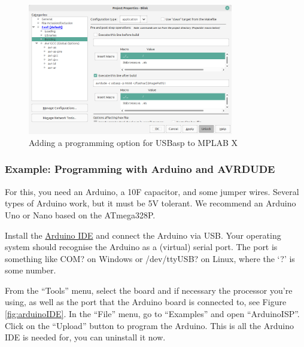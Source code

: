 \documentclass{article}
\begin{document}
\begin{figure}[htb]
\centering
\includegraphics[width=0.8\textwidth]{Pictures/AvrdudeMPLABX.png}
\caption{Adding a programming option for USBasp to MPLAB X}
\label{fig:AvrdudeMPLABX}
\end{figure}

\FloatBarrier
\subsubsection{Example: Programming with Arduino and AVRDUDE}\label{sec:exArduino}
For this, you need an Arduino, a 10\textmu F capacitor, and some jumper wires. Several types of Arduino work, but it must be 5V tolerant. We recommend an Arduino Uno or Nano based on the ATmega328P. 

Install the \href{https://www.arduino.cc/en/software}{Arduino IDE} and connect the Arduino via USB. Your operating system should recognise the Arduino as a (virtual) serial port. The port is something like COM? on Windows or /dev/ttyUSB? on Linux, where the `?' is some number. 

From the ``Tools'' menu, select the board and if necessary the processor you're using, as well as the port that the Arduino board is connected to, see Figure \ref{fig:arduinoIDE}. In the ``File'' menu, go to ``Examples'' and open ``ArduinoISP''. Click on the ``Upload'' button to program the Arduino. This is all the Arduino IDE is needed for, you can uninstall it now. 
\end{document}
